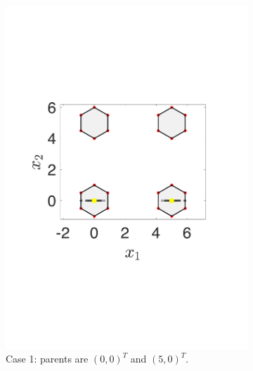 \documentclass[conference]{IEEEtran}
\begin{document}
\begin{figure}[htbp]
	\centering
	\begin{subfigure}[b]{.24\textwidth}
		\includegraphics[width=\linewidth]{Section3/crossover1}
		\caption{Case 1: parents are $(0, 0)^T$ and $(5, 0)^T$.}
		\label{fig: SBX crossover case 1}
	\end{subfigure}
	\begin{subfigure}[b]{.24\textwidth}

\end{subfigure}
\end{figure}
\end{document}
